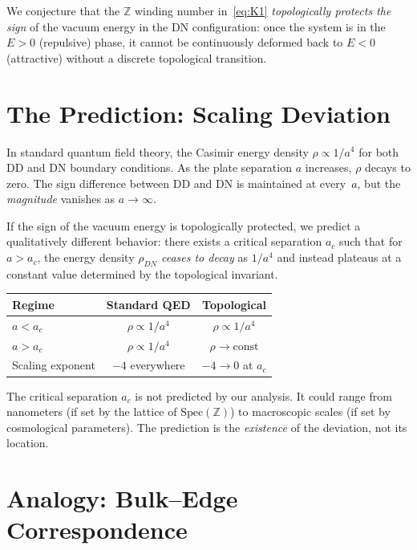 \documentclass[aps,prl,twocolumn,superscriptaddress,nofootinbib]{revtex4-2}
\newcommand{\Spec}{\mathrm{Spec}}
\begin{document}
We conjecture that the $\mathbb{Z}$ winding number
in~\eqref{eq:K1} \emph{topologically protects the sign} of the
vacuum energy in the DN configuration: once the system is in the
$E>0$ (repulsive) phase, it cannot be continuously deformed back
to $E<0$ (attractive) without a discrete topological transition.

\section{The Prediction: Scaling Deviation}

In standard quantum field theory, the Casimir energy density
$\rho\propto 1/a^4$ for both DD and DN boundary conditions.
As the plate separation $a$ increases, $\rho$ decays to zero.
The sign difference between DD and DN is maintained at every~$a$,
but the \emph{magnitude} vanishes as $a\to\infty$.

If the sign of the vacuum energy is topologically protected, we
predict a qualitatively different behavior: there exists a
critical separation $a_c$ such that for $a>a_c$, the energy
density $\rho_{DN}$ \emph{ceases to decay} as $1/a^4$ and instead
plateaus at a constant value determined by the topological
invariant.

\begin{center}
\begin{tabular}{lcc}
\toprule
Regime & Standard QED & Topological \\
\midrule
$a<a_c$ & $\rho\propto 1/a^4$ & $\rho\propto 1/a^4$ \\
$a>a_c$ & $\rho\propto 1/a^4$ & $\rho\to\mathrm{const}$ \\
\midrule
Scaling exponent & $-4$ everywhere & $-4\to 0$ at $a_c$ \\
\bottomrule
\end{tabular}
\end{center}

The critical separation $a_c$ is not predicted by our analysis.
It could range from nanometers (if set by the lattice of
$\Spec(\mathbb{Z})$) to macroscopic scales (if set by
cosmological parameters).  The prediction is the \emph{existence}
of the deviation, not its location.

\section{Analogy: Bulk--Edge Correspondence}
\end{document}
